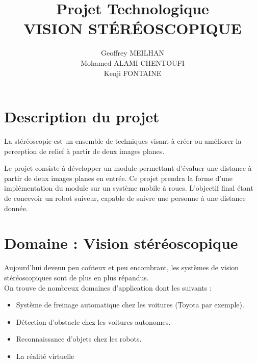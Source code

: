 \documentclass[a4paper]{article}
\title
{
	\LARGE{Projet Technologique}
	\HRule \\ [0.5cm]
	\LARGE \textbf{\uppercase{Vision Stéréoscopique}}
	\HRule \\ [0.5cm]
}
\author{Geoffrey MEILHAN \\ Mohamed ALAMI CHENTOUFI \\ Kenji FONTAINE}
\begin{document}
\null  %
\nointerlineskip  %
\vfill
\let\snewpage \newpage
\let\newpage \relax
\maketitle
\let \newpage \snewpage
\vfill
\break %


\tableofcontents
\newpage


\section{Description du projet}
La stéréoscopie est un ensemble de techniques visant à créer ou améliorer la
perception de relief à partir de deux images planes.

Le projet consiste à développer un module permettant d'évaluer une distance à
partir de deux images planes en entrée. Ce projet prendra la forme d'une implémentation
du module sur un système mobile à roues. L'objectif final étant de concevoir un robot
suiveur, capable de suivre une personne à une distance donnée.


\section{Domaine : Vision stéréoscopique}

Aujourd'hui devenu peu coûteux et peu encombrant, les systèmes de vision
stéréoscopiques sont de plus en plus répandus. \\
On trouve de nombreux domaines d'application dont les suivants :
\begin{itemize}
	\item Système de freinage automatique chez les voitures (Toyota par exemple).
	\item Détection d'obstacle chez les voitures autonomes.
	\item Reconnaissance d'objets chez les robots.
	\item La réalité virtuelle
\end{itemize}
\end{document}
